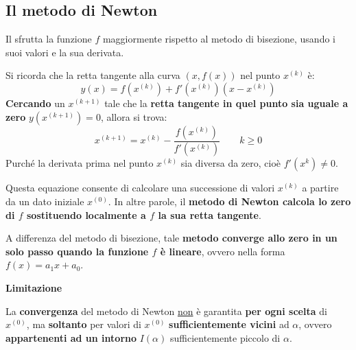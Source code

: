 \subsection{Il metodo di Newton}\label{subsection: il metodo di newton per sistemi lineari}

Il  sfrutta la funzione $f$ maggiormente rispetto al metodo di bisezione, usando i suoi valori e la sua derivata.

\highspace
Si ricorda che la retta tangente alla curva $\left(x, f\left(x\right)\right)$ nel punto $x^{(k)}$ è:
\begin{equation*}
    y\left(x\right) = f\left(x^{(k)}\right) + f'\left(x^{(k)}\right)\left(x-x^{(k)}\right)
\end{equation*}
\textbf{Cercando} un $x^{\left(k+1\right)}$ tale che la \textbf{retta tangente in quel punto sia uguale a zero} $y\left(x^{\left(k+1\right)}\right) = 0$, allora si trova:
\begin{equation}\label{eq: metodo di Newton}
    x^{\left(k+1\right)} = x^{\left(k\right)} - \dfrac{f\left(x^{\left(k\right)}\right)}{f'\left(x^{\left(k\right)}\right)} \hspace{2em} k \ge 0
\end{equation}
Purché la derivata prima nel punto $x^{(k)}$ sia diversa da zero, cioè $f'\left(x^{k}\right) \ne 0$.

\highspace
Questa equazione consente di calcolare una successione di valori $x^{(k)}$ a partire da un dato iniziale $x^{(0)}$. In altre parole, il \textbf{metodo di Newton calcola lo zero di $f$ sostituendo localmente a $f$ la sua retta tangente}.

\highspace
A differenza del metodo di bisezione, tale \textbf{metodo converge allo zero in un solo passo quando la funzione $f$ è lineare}, ovvero nella forma $f\left(x\right) = a_{1}x + a_{0}$.

\begin{flushleft}
    \textcolor{Red2}{ \textbf{Limitazione}}
\end{flushleft}
La \textbf{convergenza} del metodo di Newton \underline{non} è garantita \textbf{per ogni scelta} di $x^{(0)}$, ma \textbf{soltanto} per valori di $x^{(0)}$ \textbf{sufficientemente vicini} ad $\alpha$, ovvero \textbf{appartenenti ad un intorno} $I\left(\alpha\right)$ sufficientemente piccolo di $\alpha$.

